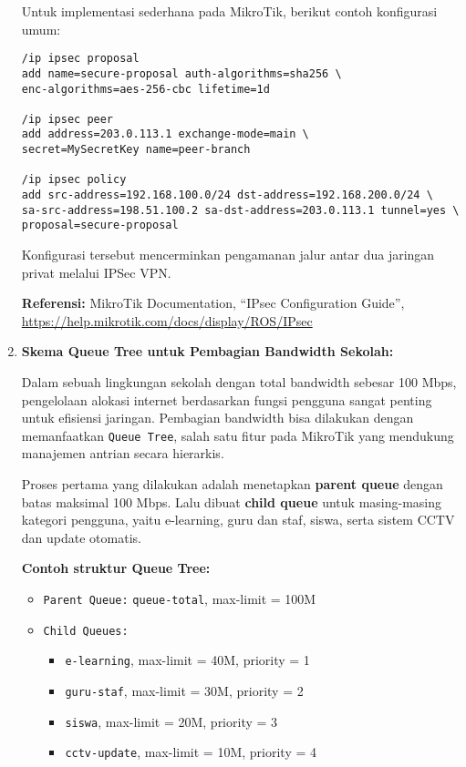 \begin{enumerate}
    Untuk implementasi sederhana pada MikroTik, berikut contoh konfigurasi umum:
    \begin{verbatim}
/ip ipsec proposal
add name=secure-proposal auth-algorithms=sha256 \
enc-algorithms=aes-256-cbc lifetime=1d

/ip ipsec peer
add address=203.0.113.1 exchange-mode=main \
secret=MySecretKey name=peer-branch

/ip ipsec policy
add src-address=192.168.100.0/24 dst-address=192.168.200.0/24 \
sa-src-address=198.51.100.2 sa-dst-address=203.0.113.1 tunnel=yes \
proposal=secure-proposal
    \end{verbatim}

    Konfigurasi tersebut mencerminkan pengamanan jalur antar dua jaringan privat melalui IPSec VPN.

    \textbf{Referensi:} MikroTik Documentation, “IPsec Configuration Guide”,\\ \url{https://help.mikrotik.com/docs/display/ROS/IPsec}

    \item \textbf{Skema Queue Tree untuk Pembagian Bandwidth Sekolah:}

    Dalam sebuah lingkungan sekolah dengan total bandwidth sebesar 100 Mbps, pengelolaan alokasi internet berdasarkan fungsi pengguna sangat penting untuk efisiensi jaringan. Pembagian bandwidth bisa dilakukan dengan memanfaatkan \texttt{Queue Tree}, salah satu fitur pada MikroTik yang mendukung manajemen antrian secara hierarkis.

    Proses pertama yang dilakukan adalah menetapkan \textbf{parent queue} dengan batas maksimal 100 Mbps. Lalu dibuat \textbf{child queue} untuk masing-masing kategori pengguna, yaitu e-learning, guru dan staf, siswa, serta sistem CCTV dan update otomatis.

    \textbf{Contoh struktur Queue Tree:}
    \begin{itemize}
        \item \texttt{Parent Queue:} \texttt{queue-total}, max-limit = 100M
        \item \texttt{Child Queues:}
        \begin{itemize}
            \item \texttt{e-learning}, max-limit = 40M, priority = 1
            \item \texttt{guru-staf}, max-limit = 30M, priority = 2
            \item \texttt{siswa}, max-limit = 20M, priority = 3
            \item \texttt{cctv-update}, max-limit = 10M, priority = 4
        \end{itemize}
    \end{itemize}


\end{enumerate}
